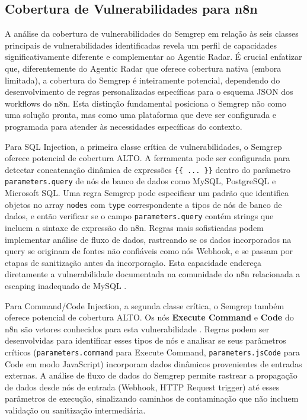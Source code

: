 \documentclass{sftex}
\begin{document}
\subsection{Cobertura de Vulnerabilidades para n8n}

A análise da cobertura de vulnerabilidades do Semgrep em relação às seis classes principais de vulnerabilidades identificadas revela um perfil de capacidades significativamente diferente e complementar ao Agentic Radar. É crucial enfatizar que, diferentemente do Agentic Radar que oferece cobertura nativa (embora limitada), a cobertura do Semgrep é inteiramente potencial, dependendo do desenvolvimento de regras personalizadas específicas para o esquema JSON dos workflows do n8n. Esta distinção fundamental posiciona o Semgrep não como uma solução pronta, mas como uma plataforma que deve ser configurada e programada para atender às necessidades específicas do contexto.

Para SQL Injection, a primeira classe crítica de vulnerabilidades, o Semgrep oferece potencial de cobertura ALTO. A ferramenta pode ser configurada para detectar concatenação dinâmica de expressões \texttt{\{\{ ... \}\}} dentro do parâmetro \texttt{parameters.query} de nós de banco de dados como MySQL, PostgreSQL e Microsoft SQL. Uma regra Semgrep pode especificar um padrão que identifica objetos no array \texttt{nodes} com \texttt{type} correspondente a tipos de nós de banco de dados, e então verificar se o campo \texttt{parameters.query} contém strings que incluem a sintaxe de expressão do n8n. Regras mais sofisticadas podem implementar análise de fluxo de dados, rastreando se os dados incorporados na query se originam de fontes não confiáveis como nós Webhook, e se passam por etapas de sanitização antes da incorporação. Esta capacidade endereça diretamente a vulnerabilidade documentada na comunidade do n8n relacionada a escaping inadequado de MySQL \cite{n8n_mysql_escaping}.

Para Command/Code Injection, a segunda classe crítica, o Semgrep também oferece potencial de cobertura ALTO. Os nós \textbf{Execute Command} e \textbf{Code} do n8n são vetores conhecidos para esta vulnerabilidade \cite{n8n_code}. Regras podem ser desenvolvidas para identificar esses tipos de nós e analisar se seus parâmetros críticos (\texttt{parameters.command} para Execute Command, \texttt{parameters.jsCode} para Code em modo JavaScript) incorporam dados dinâmicos provenientes de entradas externas. A análise de fluxo de dados do Semgrep permite rastrear a propagação de dados desde nós de entrada (Webhook, HTTP Request trigger) até esses parâmetros de execução, sinalizando caminhos de contaminação que não incluem validação ou sanitização intermediária.
\end{document}
